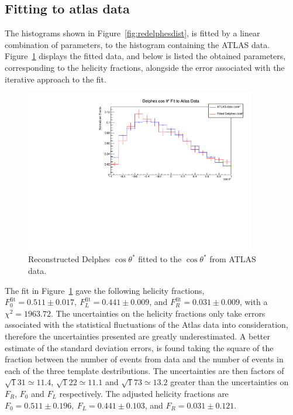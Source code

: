 \documentclass[12pt,a4paper]{article}
\numberwithin{equation}{section}
\begin{document}
\subsection{Fitting to atlas data}
The histograms shown in Figure~\ref{fig:redelphesdist}, is fitted by a linear
combination of parameters, to the histogram containing the ATLAS data.
Figure~\ref{fig:delphesfit} displays the fitted data, and below is listed the
obtained parameters, corresponding to the helicity fractions, alongside the
error associated with the iterative approach to the fit.

\begin{figure}[H]
  \centering
  \includegraphics[width=0.9\textwidth]{figures/delphes_fit}
  \caption{\label{fig:delphesfit}Reconstructed Delphes $\cos \theta^{*}$ fitted to
    the $\cos \theta^{*}$ from ATLAS data.}
\end{figure}


The fit in Figure~\ref{fig:delphesfit} gave the following helicity fractions,
$F_0^{\mathrm{fit}} = 0.511 \pm 0.017,\ F_L^{\mathrm{fit}} = 0.441 \pm 0.009$,
and $F_R^{\mathrm{fit}} = 0.031 \pm 0.009$, with a $\chi^2 = 1963.72$. The
uncertainties on the helicity fractions only take errors associated with the
statistical fluctuations of the Atlas data into consideration, therefore the
uncertainties presented are greatly underestimated. A better estimate of the
standard deviation errors, is found taking the square of the fraction between
the number of events from data and the number of events in each of the three
template destributions. The uncertainties are then factors of
$\sqrt 131 \simeq 11.4$, $\sqrt 122 \simeq 11.1$ and $\sqrt 173 \simeq 13.2$ greater than the
uncertainties on $F_R$, $F_0$ and $F_L$ respectively. The adjusted helicity
fractions are $F_0 = 0.511 \pm 0.196,\ F_L = 0.441 \pm 0.103$,
and $F_R = 0.031 \pm 0.121$.
\end{document}
